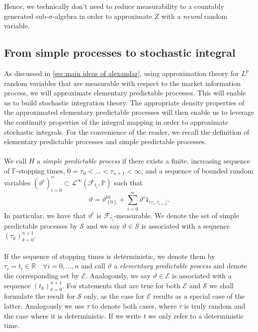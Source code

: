 \documentclass[11pt,a4paper,twoside,openany]{report}
\theoremstyle{plain} %
\theoremstyle{definition} %
\theoremstyle{remark} %
\begin{document}
Hence, we technically don't need to reduce measurability to a countably generated sub-\(\sigma\)-algebra in order to approximate \(Z\) with a \textit{neural} random variable. 
\bigbreak

\subsection{From simple processes to stochastic integral}\label{sec:From simple processes to stochastic integral}
As discussed in \cref{sec:main ideas of alexandar}, using approximation theory for \(L^p\) random variables that are measurable with respect to the market information process, we will approximate elementary predictable processes. This will enable us to build stochastic integration theory. The appropriate density properties of the approximated elementary predictable processes will then enable us to leverage the continuity properties of the integral mapping in order to approximate stochastic integrals. For the convenience of the reader, we recall the definition of elementary predictable processes and simple predictable processes.
\\\\
    We call \(H\) a \textit{simple predictable process} if there exists a finite, increasing sequence of \(\mathbb{F}\)-stopping times, \(0=\tau_0<\dots<\tau_{n+1}<\infty\), and a sequence of bounded random variables \((\vartheta^i)_{i=0}^n\subset\mathcal{L}^{\infty}(\mathcal{F}_{t_i},\mathbb{P})\) such that 
    \begin{equation}\label{eq:simple representation}
        \vartheta = \vartheta^01_{\left\{0\right\}}+\sum_{i=0}^n\vartheta^i1_{(\tau_i,\tau_{i+1}]}.
    \end{equation}
In particular, we have that \(\vartheta^i\) is \(\mathcal{F}_{\tau_i}\)-measurable. We denote the set of simple predictable processes by \(\mathcal{S}\) and we say \(\vartheta\in\mathcal{S}\) is associated with a sequence \((\tau_k)_{k=0}^{n+1}\). 
\\\\
If the sequence of stopping times is deterministic, we denote them by \(\tau_i=t_i\in\mathbb{R}\quad\forall i=0,\dots,n\) and call \(\vartheta\) a \textit{elementary predictable process} and denote the corresponding set by \(\mathcal{E}\). Analogously, we say \(\vartheta\in\mathcal{E}\) is associated with a sequence \((t_k)_{k=0}^{n+1}\).
\bigbreak
For statements that are true for both \(\mathcal{E}\) and \(\mathcal{S}\) we shall formulate the result for \(\mathcal{S}\) only, as the case for \(\mathcal{E}\) results as a special case of the latter. Analogously we use \(\tau\) to denote both cases, where \(\tau\) is truly random and the case where it is deterministic. If we write \(t\) we only refer to a deterministic time. \\\\
\end{document}

